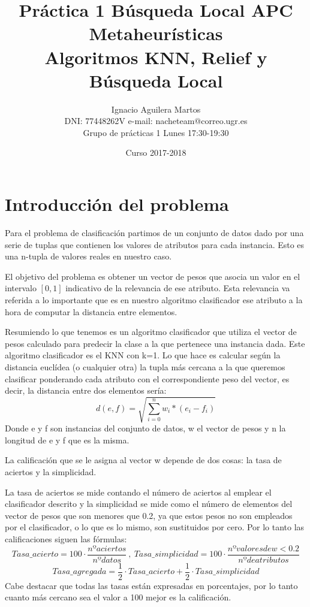 \documentclass[12pt,a4paper]{article}
\author{Ignacio Aguilera Martos \\
	DNI: 77448262V       e-mail: nacheteam@correo.ugr.es \\
	Grupo de prácticas 1 Lunes 17:30-19:30}
\title{Práctica 1 Búsqueda Local APC \\ Metaheurísticas \\ Algoritmos KNN, Relief y Búsqueda Local}
\date{Curso 2017-2018}
\begin{document}
	\maketitle

	\tableofcontents

	\newpage



	\section{Introducción del problema}
	\label{sec:introProblema}
	
	Para el problema de clasificación partimos de un conjunto de datos dado por una serie de tuplas que contienen los valores de atributos para cada instancia. Esto es una n-tupla de valores reales en nuestro caso. 

	El objetivo del problema es obtener un vector de pesos que asocia un valor en el intervalo $[0,1]$ indicativo de la relevancia de ese atributo. Esta relevancia va referida a lo importante que es en nuestro algoritmo clasificador ese atributo a la hora de computar la distancia entre elementos.
	
	Resumiendo lo que tenemos es un algoritmo clasificador que utiliza el vector de pesos calculado para predecir la clase a la que pertenece una instancia dada. Este algoritmo clasificador es el KNN con k=1. Lo que hace es calcular según la distancia euclídea (o cualquier otra) la tupla más cercana a la que queremos clasificar ponderando cada atributo con el correspondiente peso del vector, es decir, la distancia entre dos elementos sería:
	$$d(e,f) = \sqrt{\sum_{i=0}^{n}w_i * (e_{i} - f_{i})}$$
	Donde e y f son instancias del conjunto de datos, w el vector de pesos y n la longitud de e y f que es la misma.
	
	La calificación que se le asigna al vector w depende de dos cosas: la tasa de aciertos y la simplicidad.
	
	La tasa de aciertos se mide contando el número de aciertos al emplear el clasificador descrito y la simplicidad se mide como el número de elementos del vector de pesos que son menores que 0.2, ya que estos pesos no son empleados por el clasificador, o lo que es lo mismo, son sustituidos por cero. Por lo tanto las calificaciones siguen las fórmulas:
	$$Tasa\_acierto = 100\cdot \frac{nº aciertos}{nº datos} \ , \ Tasa\_simplicidad = 100\cdot \frac{nº valores de w < 0.2}{nº de atributos}$$
	$$Tasa\_agregada = \frac{1}{2}\cdot Tasa\_acierto + \frac{1}{2}\cdot Tasa\_simplicidad$$
	Cabe destacar que todas las tasas están expresadas en porcentajes, por lo tanto cuanto más cercano sea el valor a 100 mejor es la calificación.
	
\end{document}
